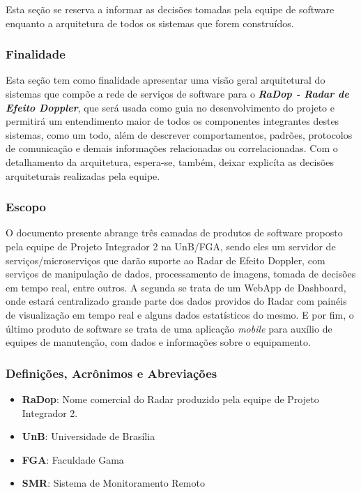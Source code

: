 Esta seção se reserva a informar as decisões tomadas pela equipe de software enquanto a arquitetura de todos os sistemas que forem construídos.

\subsubsection{Finalidade}\label{finalidade}

Esta seção tem como finalidade apresentar uma visão geral arquitetural
do sistemas que compõe a rede de serviços de software para o
\textbf{\emph{RaDop - Radar de Efeito Doppler}}, que será usada como
guia no desenvolvimento do projeto e permitirá um entendimento maior de
todos os componentes integrantes destes sistemas, como um todo, além de
descrever comportamentos, padrões, protocolos de comunicação e demais
informações relacionadas ou correlacionadas. Com o detalhamento da
arquitetura, espera-se, também, deixar explicíta as decisões
arquiteturais realizadas pela equipe.

\subsubsection{Escopo}\label{escopo}

O documento presente abrange três camadas de produtos de software
proposto pela equipe de Projeto Integrador 2 na UnB/FGA, sendo eles um
servidor de serviços/microserviços que darão suporte ao Radar de Efeito
Doppler, com serviços de manipulação de dados, processamento de imagens,
tomada de decisões em tempo real, entre outros. A segunda se trata de um
WebApp de Dashboard, onde estará centralizado grande parte dos dados
providos do Radar com painéis de visualização em tempo real e alguns
dados estatísticos do mesmo. E por fim, o último produto de software se
trata de uma aplicação \emph{mobile} para auxílio de equipes de
manutenção, com dados e informações sobre o equipamento.

\subsubsection{Definições, Acrônimos e Abreviações}\label{definicoes-acronimos-e-abreviacoes}

\begin{itemize}
\tightlist
\item
  \textbf{RaDop}: Nome comercial do Radar produzido pela equipe de
  Projeto Integrador 2.
\item
  \textbf{UnB}: Universidade de Brasília
\item
  \textbf{FGA}: Faculdade Gama
\item
  \textbf{SMR}: Sistema de Monitoramento Remoto
\end{itemize}

